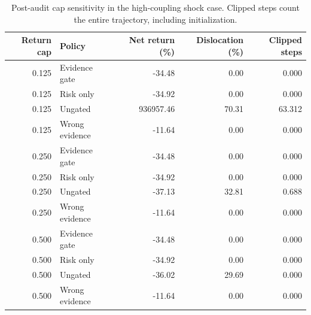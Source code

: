 \begin{table}[htbp]\centering\small
\begin{tabular}{rlrrr}\toprule
Return cap & Policy & Net return (\%) & Dislocation (\%) & Clipped steps\\\midrule
0.125 & Evidence gate & -34.48 & 0.00 & 0.000\\
0.125 & Risk only & -34.92 & 0.00 & 0.000\\
0.125 & Ungated & 936957.46 & 70.31 & 63.312\\
0.125 & Wrong evidence & -11.64 & 0.00 & 0.000\\
0.250 & Evidence gate & -34.48 & 0.00 & 0.000\\
0.250 & Risk only & -34.92 & 0.00 & 0.000\\
0.250 & Ungated & -37.13 & 32.81 & 0.688\\
0.250 & Wrong evidence & -11.64 & 0.00 & 0.000\\
0.500 & Evidence gate & -34.48 & 0.00 & 0.000\\
0.500 & Risk only & -34.92 & 0.00 & 0.000\\
0.500 & Ungated & -36.02 & 29.69 & 0.000\\
0.500 & Wrong evidence & -11.64 & 0.00 & 0.000\\
\bottomrule\end{tabular}
\caption{Post-audit cap sensitivity in the high-coupling shock case. Clipped steps count the entire trajectory, including initialization.}
\end{table}